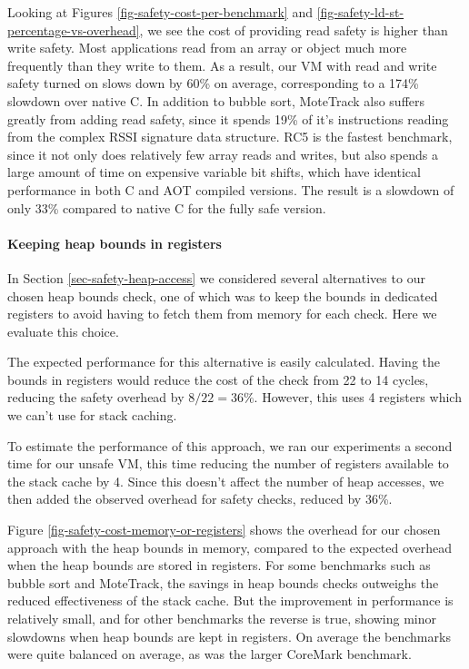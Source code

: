 Looking at Figures \ref{fig-safety-cost-per-benchmark} and \ref{fig-safety-ld-st-percentage-vs-overhead}, we see the cost of providing read safety is higher than write safety. Most applications read from an array or object much more frequently than they write to them. As a result, our VM with read and write safety turned on slows down by 60\% on average, corresponding to a 174\% slowdown over native C. In addition to bubble sort, MoteTrack also suffers greatly from adding read safety, since it spends 19\% of it's instructions reading from the complex RSSI signature data structure. RC5 is the fastest benchmark, since it not only does relatively few array reads and writes, but also spends a large amount of time on expensive variable bit shifts, which have identical performance in both C and AOT compiled versions. The result is a slowdown of only 33\% compared to native C for the fully safe version.

\paragraph{Keeping heap bounds in registers}
In Section \ref{sec-safety-heap-access} we considered several alternatives to our chosen heap bounds check, one of which was to keep the bounds in dedicated registers to avoid having to fetch them from memory for each check. Here we evaluate this choice.

The expected performance for this alternative is easily calculated. Having the bounds in registers would reduce the cost of the check from 22 to 14 cycles, reducing the safety overhead by $8/22=36\%$. However, this uses 4 registers which we can't use for stack caching.

To estimate the performance of this approach, we ran our experiments a second time for our unsafe VM, this time reducing the number of registers available to the stack cache by 4. Since this doesn't affect the number of heap accesses, we then added the observed overhead for safety checks, reduced by 36\%.

Figure \ref{fig-safety-cost-memory-or-registers} shows the overhead for our chosen approach with the heap bounds in memory, compared to the expected overhead when the heap bounds are stored in registers. For some benchmarks such as bubble sort and MoteTrack, the savings in heap bounds checks outweighs the reduced effectiveness of the stack cache. But the improvement in performance is relatively small, and for other benchmarks the reverse is true, showing minor slowdowns when heap bounds are kept in registers. On average the benchmarks were quite balanced on average, as was the larger CoreMark benchmark.

